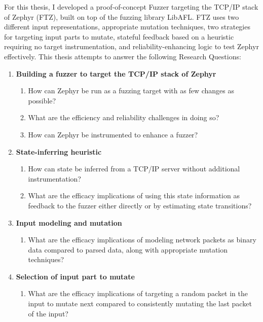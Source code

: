 \documentclass[twocolumn]{article}
\newcommand{\proj}{FTZ\xspace}
\begin{document}
For this thesis, I developed a proof-of-concept Fuzzer targeting the TCP/IP stack of Zephyr (\proj), built on top of the fuzzing library LibAFL. \proj uses two different input representations, appropriate mutation techniques, two strategies for targeting input parts to mutate, stateful feedback based on a heuristic requiring no target instrumentation, and reliability-enhancing logic to test Zephyr effectively. This thesis attempts to answer the following Research Questions:
\begin{enumerate}[\hspace{-0.4em}]
  \item \textbf{Building a fuzzer to target the TCP/IP stack of Zephyr}
        \begin{enumerate}
          \item How can Zephyr be run as a fuzzing target with as few changes as possible?
          \item What are the efficiency and reliability challenges in doing so?
          \item How can Zephyr be instrumented to enhance a fuzzer?
        \end{enumerate}
  \item \textbf{State-inferring heuristic}
        \begin{enumerate}
          \item How can state be inferred from a TCP/IP server without additional instrumentation?
          \item What are the efficacy implications of using this state information as feedback to the fuzzer either directly or by estimating state transitions?
        \end{enumerate}
  \item \textbf{Input modeling and mutation}
        \begin{enumerate}
          \item What are the efficacy implications of modeling network packets as binary data compared to parsed data, along with appropriate mutation techniques?
        \end{enumerate}
  \item \textbf{Selection of input part to mutate}
        \begin{enumerate}
          \item What are the efficacy implications of targeting a random packet in the input to mutate next compared to consistently mutating the last packet of the input?
        \end{enumerate}
\end{enumerate}
\end{document}
